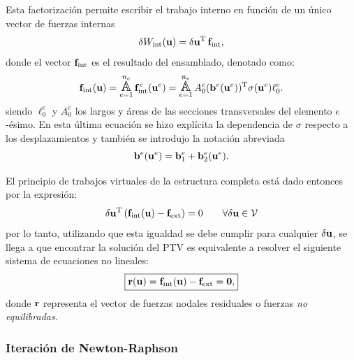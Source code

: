 Esta factorización permite escribir el trabajo interno en función de un único vector de fuerzas internas
%
\begin{equation}
\delta  W_{ \text{int} } (\bfu) %
%
=
\delta\bfu^{\text{T}}
\,
\bff_{\text{int}},
\end{equation}
%
donde el vector ${\bf f}_{\text{int}}$ es el resultado del ensamblado, denotado como:
%
\begin{equation}
\bff_{\text{int}}(\bfu) = \assem_{e=1}^{n_e} \bff^e_{\text{int}}(\bfu^e) 
=\assem_{e=1}^{n_e} A^e_0   (\bfb^e (\bfu^e) )^{\text{T}} \sigma(\bfu^e) \ell^e_0.
\end{equation}
%
siendo $\ell_0^e$ y $A_0^e$ los largos y áreas de las secciones transversales del elemento $e$-ésimo. %
%
En esta última ecuación se hizo explícita la dependencia de $\sigma$ respecto a los desplazamientos y también se introdujo la notación abreviada
%
\begin{equation}
{\bf b}^e ({\bf u}^e) = {\bf b}_1^e + {\bf b}_2^e ({\bf u}^e).
\end{equation}

El principio de trabajos virtuales de la estructura completa está dado entonces por la expresión:
%
\begin{equation}
\delta {\bf u}^{\text{T}} \left( {\bf f}_{\text{int}}({\bf u}) - {\bf f}_{\text{ext}} \right) = 0 \qquad \forall \delta {\bf u} \in {\mathcal V}
\end{equation}
%
por lo tanto, utilizando que esta igualdad se debe cumplir para cualquier $\delta {\bf u}$, se llega a que encontrar la solución del PTV es equivalente a resolver el siguiente sistema de ecuaciones no lineales:
%
\begin{equation}\label{eqn:residuo}
\boxed{
	{\bf r}({\bf u}) = {\bf f}_{\text{int}}({\bf u}) - {\bf f}_{\text{ext}} = \boldsymbol{0},
}
\end{equation}
%
donde ${\bf r}$ representa el vector de fuerzas nodales residuales o fuerzas \textit{no equilibradas}.




\subsubsection{Iteración de Newton-Raphson} \label{sec:iterNR}

